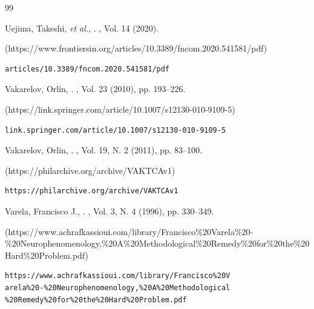 \begin{thebibliography}{99}
{\begin{bItem}[TakeshiUejima]
Uejima, Takeshi, \textit{et al.},
.
, Vol. 14 
(2020). 
%
\begin{boxurl}(https://www.frontiersin.org/articles/10.3389/fncom.2020.541581/pdf)
\begin{lstlisting}
articles/10.3389/fncom.2020.541581/pdf
\end{lstlisting}
\end{boxurl}\end{bItem}




\begin{bItem}[OrlinVakarelov]
Vakarelov, Orlin,
.
, 
Vol. 23 (2010), pp. 193--226. 
%
\begin{boxurl}(https://link.springer.com/article/10.1007/s12130-010-9109-5)
\begin{lstlisting}
link.springer.com/article/10.1007/s12130-010-9109-5
\end{lstlisting}
\end{boxurl}\end{bItem}






\begin{bItem}[VakarelovAgent]
Vakarelov, Orlin, 
.
,
Vol. 19, N. 2 (2011), pp. 83--100.
%
\begin{boxurl}(https://philarchive.org/archive/VAKTCAv1)
\begin{lstlisting}
https://philarchive.org/archive/VAKTCAv1
\end{lstlisting}
\end{boxurl}\end{bItem}




\begin{bItem}[FranciscoVarela]
Varela, Francisco J.,  
.
,
Vol. 3, N. 4 (1996), pp. 330--349.
%
\begin{boxurl}(https://www.achrafkassioui.com/library/Francisco\%20Varela\%20-\%20Neurophenomenology,\%20A\%20Methodological\%20Remedy\%20for\%20the\%20Hard\%20Problem.pdf)
\begin{lstlisting}
https://www.achrafkassioui.com/library/Francisco%20V
arela%20-%20Neurophenomenology,%20A%20Methodological
%20Remedy%20for%20the%20Hard%20Problem.pdf
\end{lstlisting}
\end{boxurl}\end{bItem}



}
\end{thebibliography}

